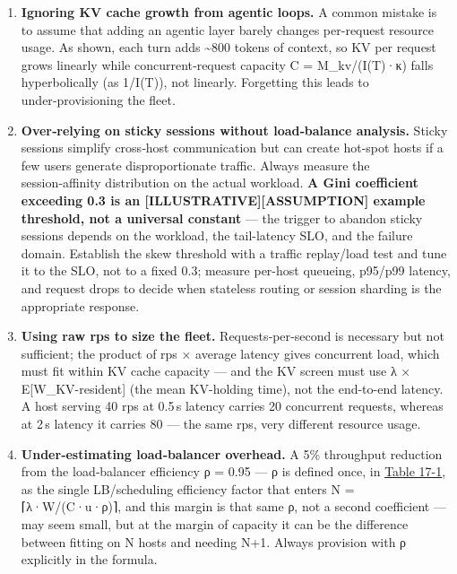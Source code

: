 \label{common-mistakes}


\begin{enumerate}
\def\labelenumi{\arabic{enumi}.}
\item
  \textbf{Ignoring KV cache growth from agentic loops.} A common mistake
  is to assume that adding an agentic layer barely changes per-request
  resource usage. As shown, each turn adds \textasciitilde800 tokens of
  context, so KV per request grows linearly while concurrent‑request
  capacity C = M\_kv/(I(T)·κ) falls hyperbolically (as 1/I(T)), not
  linearly. Forgetting this leads to under‑provisioning the fleet.
\item
  \textbf{Over‑relying on sticky sessions without load‑balance
  analysis.} Sticky sessions simplify cross‑host communication but can
  create hot‑spot hosts if a few users generate disproportionate
  traffic. Always measure the session‑affinity distribution on the
  actual workload. \textbf{A Gini coefficient exceeding 0.3 is an
  \mbox{{[}ILLUSTRATIVE{]}}\hspace{0pt}\mbox{{[}ASSUMPTION{]}} example threshold, not a universal
  constant} --- the trigger to abandon sticky sessions depends on the
  workload, the tail-latency SLO, and the failure domain. Establish the
  skew threshold with a traffic replay/load test and tune it to the SLO,
  not to a fixed 0.3; measure per-host queueing, p95/p99 latency, and
  request drops to decide when stateless routing or session sharding is
  the appropriate response.
\item
  \textbf{Using raw rps to size the fleet.} Requests‑per‑second is
  necessary but not sufficient; the product of rps × average latency
  gives concurrent load, which must fit within KV cache capacity --- and
  the KV screen must use λ × E{[}W\_KV-resident{]} (the mean KV-holding
  time), not the end-to-end latency. A host serving 40 rps at 0.5\,s
  latency carries 20 concurrent requests, whereas at 2\,s latency it
  carries 80 --- the same rps, very different resource usage.
\item
  \textbf{Under‑estimating load‑balancer overhead.} A 5\% throughput
  reduction from the load‑balancer efficiency ρ = 0.95 --- ρ is defined
  once, in \hyperref[tab:17.1]{Table 17-1}, as the single LB/scheduling efficiency factor
  that enters N = ⌈λ·W/(C·u·ρ)⌉, and this margin is that same ρ, not a
  second coefficient --- may seem small, but at the margin of capacity
  it can be the difference between fitting on N hosts and needing N+1.
  Always provision with ρ explicitly in the formula.

\end{enumerate}
